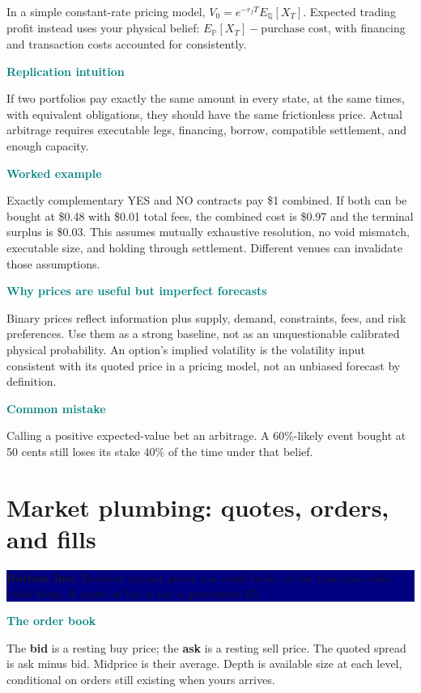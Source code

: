 \documentclass[10pt,letterpaper]{article}
\newcommand{\bl}[1]{\noindent\colorbox{navy}{\parbox{\dimexpr\linewidth-2\fboxsep}{\color{white}\textbf{Bottom line.} #1}}\par\medskip}
\newcommand{\topic}[2]{\clearpage\section{#1}\bl{#2}}
\newcommand{\sub}[1]{\par\textbf{\textcolor{teal}{#1}}\par}
\newcommand{\ex}[1]{\sub{Worked example}#1}
\newcommand{\pit}[1]{\sub{Common mistake}#1}
\begin{document}
In a simple constant-rate pricing model, $V_0=e^{-r_fT}E_{\mathbb Q}[X_T]$. Expected trading profit instead uses your physical belief: $E_{\mathbb P}[X_T]-\text{purchase cost}$, with financing and transaction costs accounted for consistently.
\sub{Replication intuition}
If two portfolios pay exactly the same amount in every state, at the same times, with equivalent obligations, they should have the same frictionless price. Actual arbitrage requires executable legs, financing, borrow, compatible settlement, and enough capacity.
\ex{Exactly complementary YES and NO contracts pay \$1 combined. If both can be bought at \$0.48 with \$0.01 total fees, the combined cost is \$0.97 and the terminal surplus is \$0.03. This assumes mutually exhaustive resolution, no void mismatch, executable size, and holding through settlement. Different venues can invalidate those assumptions.}
\sub{Why prices are useful but imperfect forecasts}
Binary prices reflect information plus supply, demand, constraints, fees, and risk preferences. Use them as a strong baseline, not as an unquestionable calibrated physical probability. An option's implied volatility is the volatility input consistent with its quoted price in a pricing model, not an unbiased forecast by definition.
\pit{Calling a positive expected-value bet an arbitrage. A 60\%-likely event bought at 50 cents still loses its stake 40\% of the time under that belief.}
\topic{Market plumbing: quotes, orders, and fills}{Backtest against prices you could trade, at the time you could trade them. A quote or bar is not a guaranteed fill.}
\sub{The order book}
The \textbf{bid} is a resting buy price; the \textbf{ask} is a resting sell price. The quoted spread is ask minus bid. Midprice is their average. Depth is available size at each level, conditional on orders still existing when yours arrives.
\end{document}

